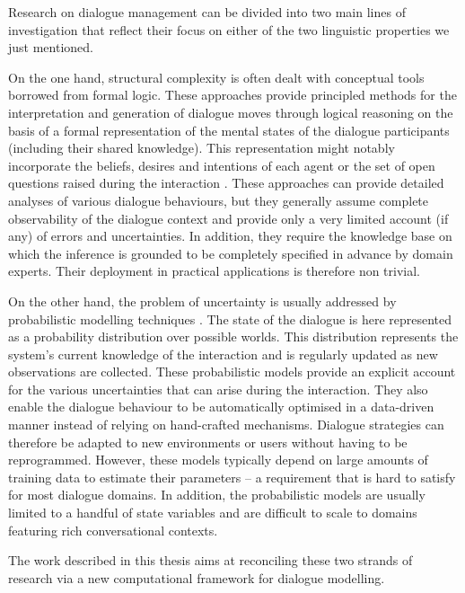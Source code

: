 Research on dialogue management can be divided into two main lines of investigation that reflect their focus on either of the two linguistic properties we just mentioned.  

On the one hand, structural complexity is often dealt with conceptual tools borrowed from formal logic.  These approaches provide principled methods for the interpretation and generation of dialogue moves through logical reasoning on the basis of a formal representation of the mental states of the dialogue participants (including their shared knowledge). This representation might notably incorporate the beliefs, desires and intentions of each agent \citep{Cohen1979,Allen1980} or the set of open questions raised during the interaction \citep{larsson2002,Ginzburg2012}.  These approaches can provide detailed analyses of various dialogue behaviours, but they generally assume complete observability of the dialogue context and provide only a very limited account (if any) of errors and uncertainties. In addition, they require the knowledge base on which the inference is grounded to be completely specified in advance by domain experts.  Their deployment in practical applications is therefore non trivial. 

On the other hand, the problem of uncertainty is usually addressed by probabilistic modelling techniques \citep{Roy:2000,FramptonL09,Young:2010}.  The state of the dialogue is here represented as a probability distribution over possible worlds.  This distribution represents the system's current knowledge of the interaction and is regularly updated as new observations are collected. These probabilistic models provide an explicit account for the various uncertainties that can arise during the interaction. They also enable the dialogue behaviour to be automatically optimised in a data-driven manner instead of relying on hand-crafted mechanisms.  Dialogue strategies can therefore be adapted to new environments or users without having to be reprogrammed. However, these models typically depend on large amounts of training data to estimate their parameters -- a requirement that is hard to satisfy for most dialogue domains.  In addition, the probabilistic models are usually limited to a handful of state variables and are difficult to scale to domains featuring rich conversational contexts. 

The work described in this thesis aims at reconciling these two strands of research via a new computational framework for dialogue modelling. 

